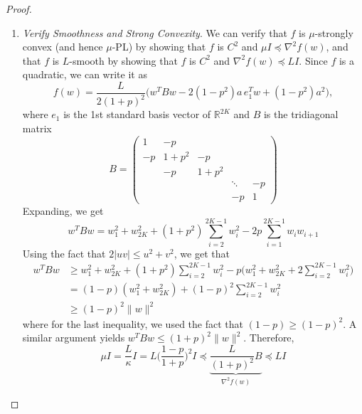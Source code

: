 \begin{proof}
\begin{enumerate}
			\item \textit{Verify Smoothness and Strong Convexity}. We can verify that $f$ is $\mu$-strongly convex (and hence $\mu$-PL) by showing that $f$ is $C^2$ and $\mu I \preceq \nabla^2 f(w)$, and that $f$ is $L$-smooth by showing that $f$ is $C^2$ and $\nabla^2 f(w) \preceq L I$. Since $f$ is a quadratic, we can write it as 
				\begin{equation}
					f(w) = \frac{L}{2(1 + p)^2} \big( w^T B w - 2 (1 - p^2) a \, e_1^T w + (1 - p^2) a^2 \big), 
				\end{equation}
				where $e_1$ is the 1st standard basis vector of $\mathbb{R}^{2K}$ and $B$ is the tridiagonal matrix 
				\begin{equation}
					B = \begin{pmatrix} 
						1 & -p & & & \\ 
						-p & 1 + p^2 & -p & & \\ 
							 & -p & 1 + p^2 & & \\ 
							 & & & \ddots & -p \\ 
							 & & & -p & 1
					\end{pmatrix} 
				\end{equation}
				Expanding, we get 
				\begin{equation}
					w^T B w = w_1^2 + w_{2K}^2 + (1 + p^2) \sum_{i=2}^{2K-1} w_i^2 - 2p \sum_{i=1}^{2K-1} w_i w_{i+1}
				\end{equation}
				Using the fact that $2 |uv| \leq u^2 + v^2$, we get that 
				\begin{align}
					w^T B w & \geq w_1^2 + w_{2K}^2 + (1 + p^2) \sum_{i=2}^{2K-1} w_i^2 - p \bigg( w_1^2 + w_{2K}^2 + 2 \sum_{i=2}^{2K-1} w_i^2 \bigg) \\ 
									& = (1 - p) (w_1^2 + w_{2K}^2) + (1 - p)^2 \sum_{i=2}^{2K-1} w_i^2 \\ 
									& \geq (1 - p)^2 \|w\|^2
				\end{align}
				where for the last inequality, we used the fact that $(1 - p) \geq (1 - p)^2$. A similar argument yields $w^T B w \leq (1 + p)^2 \|w\|^2$. Therefore, 
				\begin{equation}
					\mu I = \frac{L}{\kappa} I = L \bigg( \frac{1 - p}{1 + p} \bigg)^2 I \preceq \underbrace{\frac{L}{(1 + p)^2} B}_{\nabla^2 f(w)} \preceq L I
				\end{equation}


\end{enumerate}
\end{proof}
